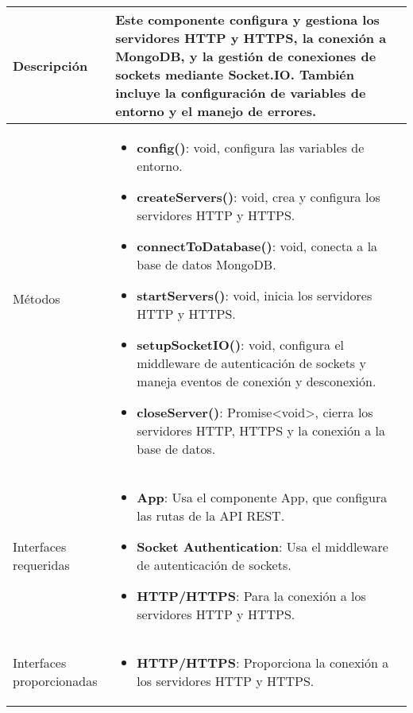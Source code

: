 \begin{longtable}{
    >{\columncolor{lightgreen!20}}p{4cm}
    p{12cm}
    }
    \midrule
    Descripción & Este componente configura y gestiona los servidores HTTP y HTTPS, la conexión a MongoDB, y la gestión de conexiones de sockets mediante Socket.IO. También incluye la configuración de variables de entorno y el manejo de errores. \\
    \midrule
    Métodos & \begin{itemize}[nosep,leftmargin=*]
      \item \textbf{config()}: void, configura las variables de entorno.
      \item \textbf{createServers()}: void, crea y configura los servidores HTTP y HTTPS.
      \item \textbf{connectToDatabase()}: void, conecta a la base de datos MongoDB.
      \item \textbf{startServers()}: void, inicia los servidores HTTP y HTTPS.
      \item \textbf{setupSocketIO()}: void, configura el middleware de autenticación de sockets y maneja eventos de conexión y desconexión.
      \item \textbf{closeServer()}: Promise<void>, cierra los servidores HTTP, HTTPS y la conexión a la base de datos.
    \end{itemize} \\
    \midrule
    Interfaces requeridas & \begin{itemize}[nosep,leftmargin=*]
      \item \textbf{App}: Usa el componente App, que configura las rutas de la API REST.
      \item \textbf{Socket Authentication}: Usa el middleware de autenticación de sockets.
      \item \textbf{HTTP/HTTPS}: Para la conexión a los servidores HTTP y HTTPS.
    \end{itemize} \\
    \midrule
    Interfaces proporcionadas & \begin{itemize}[nosep,leftmargin=*]
      \item \textbf{HTTP/HTTPS}: Proporciona la conexión a los servidores HTTP y HTTPS.
    \end{itemize} \\
\end{longtable}


